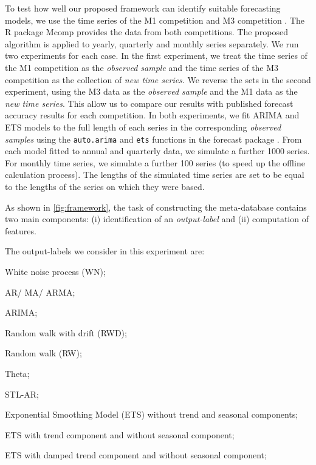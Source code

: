 \documentclass[11pt,a4paper,]{article}
\theoremstyle{definition}
\theoremstyle{definition}
\theoremstyle{definition}
\theoremstyle{remark}
\begin{document}
To test how well our proposed framework can identify suitable
forecasting models, we use the time series of the M1 competition
\autocite{makridakis1982accuracy} and M3 competition
\autocite{makridakis2000m3}. The R package Mcomp \autocite{hyndmanmcomp}
provides the data from both competitions. The proposed algorithm is
applied to yearly, quarterly and monthly series separately. We run two
experiments for each case. In the first experiment, we treat the time
series of the M1 competition as the \emph{observed sample} and the time
series of the M3 competition as the collection of \emph{new time
series}. We reverse the sets in the second experiment, using the M3 data
as the \emph{observed sample} and the M1 data as the \emph{new time
series}. This allow us to compare our results with published forecast
accuracy results for each competition. In both experiments, we fit ARIMA
and ETS models to the full length of each series in the corresponding
\emph{observed samples} using the \texttt{auto.arima} and \texttt{ets}
functions in the forecast package \autocite{Hyndman2008}. From each
model fitted to annual and quarterly data, we simulate a further 1000
series. For monthly time series, we simulate a further 100 series (to
speed up the offline calculation process). The lengths of the simulated
time series are set to be equal to the lengths of the series on which
they were based.

As shown in \autoref{fig:framework}, the task of constructing the
meta-database contains two main components: (i) identification of an
\emph{output-label} and (ii) computation of features.

The output-labels we consider in this experiment are:

\begin{compactenum}[\hspace*{1cm}(a)]
  \item White noise process (WN);
  \item AR/ MA/ ARMA;
  \item ARIMA;
  \item Random walk with drift (RWD);
  \item Random walk (RW);
  \item Theta;
  \item STL-AR;
  \item Exponential Smoothing Model (ETS) without trend and seasonal components;
  \item ETS with trend component and without seasonal component;
  \item ETS with damped trend component and without seasonal component;
  \end{compactenum}
\end{document}
